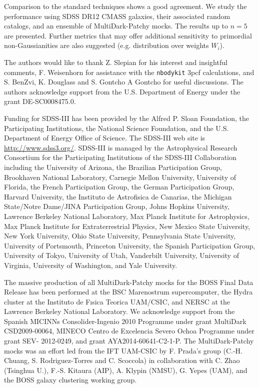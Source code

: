 \documentclass{aa}
\begin{document}
Comparison to the standard techniques shows a good agreement. We study the performance using SDSS DR12 CMASS galaxies, their associated random catalogs, and an  ensemble of MultiDark-Patchy mocks. The results up to $n=5$ are presented. Further metrics that may offer additional sensitivity to primordial non-Gaussianities are also suggested (e.g. distribution over weights $W_i$).

\begin{acknowledgements}

The authors would like to thank Z. Slepian for his interest and insightful comments, F. Weisenhorn for assistance with the {\tt nbodykit} 3pcf calculations, and S. BenZvi, K. Douglass and S. Gontcho A Gontcho for useful discussions. The authors acknowledge support from the U.S. Department of Energy under the grant DE-SC0008475.0. 

Funding for SDSS-III has been provided by the Alfred P. Sloan Foundation, the Participating Institutions, the National Science Foundation, and the U.S. Department of Energy Office of Science. The SDSS-III web site is \url{http://www.sdss3.org/}. SDSS-III is managed by the Astrophysical Research Consortium for the Participating Institutions of the SDSS-III Collaboration including the University of Arizona, the Brazilian Participation Group, Brookhaven National Laboratory, Carnegie Mellon University, University of Florida, the French Participation Group, the German Participation Group, Harvard University, the Instituto de Astrofisica de Canarias, the Michigan State/Notre Dame/JINA Participation Group, Johns Hopkins University, Lawrence Berkeley National Laboratory, Max Planck Institute for Astrophysics, Max Planck Institute for Extraterrestrial Physics, New Mexico State University, New York University, Ohio State University, Pennsylvania State University, University of Portsmouth, Princeton University, the Spanish Participation Group, University of Tokyo, University of Utah, Vanderbilt University, University of Virginia, University of Washington, and Yale University.

The massive production of all MultiDark-Patchy mocks for the BOSS Final Data Release has been performed at the BSC Marenostrum supercomputer, the Hydra cluster at the Instituto de Fısica Teorica UAM/CSIC, and NERSC at the Lawrence Berkeley National Laboratory. We acknowledge support from the Spanish MICINNs Consolider-Ingenio 2010 Programme under grant MultiDark CSD2009-00064, MINECO Centro de Excelencia Severo Ochoa Programme under grant SEV- 2012-0249, and grant AYA2014-60641-C2-1-P. The MultiDark-Patchy mocks was an effort led from the IFT UAM-CSIC by F. Prada’s group (C.-H. Chuang, S. Rodriguez-Torres and C. Scoccola) in collaboration with C. Zhao (Tsinghua U.), F.-S. Kitaura (AIP), A. Klypin (NMSU), G. Yepes (UAM), and the BOSS galaxy clustering working group.

\end{acknowledgements}
\end{document}
